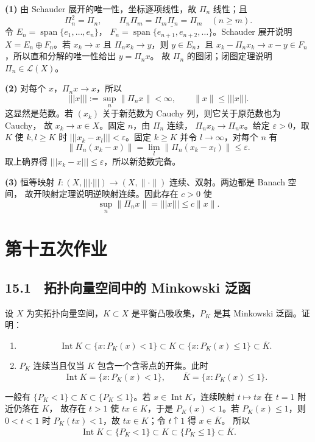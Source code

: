 \textbf{(1)} 由 Schauder 展开的唯一性，坐标逐项线性，故 $\Pi_n$ 线性；且
\[
 \Pi_n^2=\Pi_n,\qquad
 \Pi_n\Pi_m=\Pi_m\Pi_n=\Pi_m\quad(n\ge m).
\]
令 $E_n=\operatorname{span}\{e_1,\dots,e_n\}$，
$F_n=\overline{\operatorname{span}\{e_{n+1},e_{n+2},\dots\}}$。Schauder 展开说明
$X=E_n\oplus F_n$。若 $x_k\to x$ 且 $\Pi_nx_k\to y$，则 $y\in E_n$，且
$x_k-\Pi_nx_k\to x-y\in F_n$，所以直和分解的唯一性给出 $y=\Pi_nx$。
故 $\Pi_n$ 的图闭；闭图定理说明 $\Pi_n\in\mathcal L(X)$。

\textbf{(2)} 对每个 $x$，$\Pi_nx\to x$，所以
\[
 |||x|||:=\sup_n\|\Pi_nx\|<\infty,\qquad \|x\|\le|||x|||.
\]
这显然是范数。若 $(x_k)$ 关于新范数为 Cauchy 列，则它关于原范数也为 Cauchy，
故 $x_k\to x\in X$。固定 $n$，由 $\Pi_n$ 连续，
$\Pi_nx_k\to\Pi_nx$。给定 $\varepsilon>0$，取 $K$ 使 $k,l\ge K$ 时
$|||x_k-x_l|||<\varepsilon$。固定 $k\ge K$ 并令 $l\to\infty$，对每个 $n$ 有
\[
 \|\Pi_n(x_k-x)\|=\lim_l\|\Pi_n(x_k-x_l)\|\le\varepsilon.
\]
取上确界得 $|||x_k-x|||\le\varepsilon$，所以新范数完备。

\textbf{(3)} 恒等映射
$I:(X,|||\cdot|||)\to(X,\|\cdot\|)$ 连续、双射。两边都是 Banach 空间，
故开映射定理说明逆映射连续。因此存在 $c>0$ 使
\[
 \sup_n\|\Pi_nx\|=|||x|||\le c\|x\|.
\]

\section{第十五次作业}

\subsection*{15.1　拓扑向量空间中的 Minkowski 泛函}

\begin{problem}
设 $X$ 为实拓扑向量空间，$K\subset X$ 是平衡凸吸收集，$P_K$ 是其 Minkowski
泛函。证明：
\begin{enumerate}
 \item
 \[
  \operatorname{Int}K\subset\{x:P_K(x)<1\}\subset K
  \subset\{x:P_K(x)\le1\}\subset\overline K.
 \]
 \item $P_K$ 连续当且仅当 $K$ 包含一个含零点的开集。此时
 \[
  \operatorname{Int}K=\{x:P_K(x)<1\},
  \qquad \overline K=\{x:P_K(x)\le1\}.
 \]
\end{enumerate}
\end{problem}

一般有 $\{P_K<1\}\subset K\subset\{P_K\le1\}$。若
$x\in\operatorname{Int}K$，连续映射 $t\mapsto tx$ 在 $t=1$ 附近仍落在 $K$，
故存在 $t>1$ 使 $tx\in K$，于是 $P_K(x)<1$。若 $P_K(x)\le1$，则
$0<t<1$ 时 $P_K(tx)<1$，故 $tx\in K$；令 $t\uparrow1$ 得 $x\in\overline K$。
所以
\[
 \operatorname{Int}K\subset\{P_K<1\}\subset K
 \subset\{P_K\le1\}\subset\overline K.
\]

